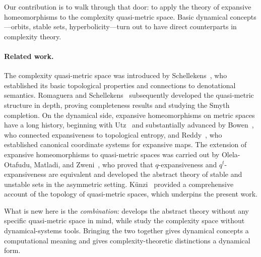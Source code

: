 \documentclass[11pt,a4paper]{article}
\theoremstyle{plain}
\theoremstyle{definition}
\begin{document}
Our contribution is to walk through that door: to apply the theory
of expansive homeomorphisms to the complexity quasi-metric space.
Basic dynamical concepts---orbits, stable sets, hyperbolicity---turn
out to have direct counterparts in complexity theory.

\paragraph{Related work.}
The complexity quasi-metric space was introduced by
Schellekens~\cite{schellekens1995}, who established its basic
topological properties and connections to denotational semantics.
Romaguera and Schellekens~\cite{romaguera1999} subsequently
developed the quasi-metric structure in depth, proving
completeness results and studying the Smyth completion.  On
the dynamical side, expansive homeomorphisms on metric spaces
have a long history, beginning with Utz~\cite{utz1950} and
substantially advanced by Bowen~\cite{bowen1975}, who connected
expansiveness to topological entropy, and Reddy~\cite{reddy1983},
who established canonical coordinate systems for expansive maps.
The extension of expansive homeomorphisms to quasi-metric spaces
was carried out by Olela-Otafudu, Matladi, and
Zweni~\cite{olela2024}, who proved that $q$-expansiveness and
$q^t$-expansiveness are equivalent and developed the abstract
theory of stable and unstable sets in the asymmetric setting.
K\"unzi~\cite{kunzi1995,kunzi2001} provided a comprehensive
account of the topology of quasi-metric spaces, which underpins
the present work.

What is new here is the \emph{combination}: \cite{olela2024}
develops the abstract theory without any specific quasi-metric
space in mind, while \cite{schellekens1995,romaguera1999} study
the complexity space without dynamical-systems tools.  Bringing
the two together gives dynamical concepts a computational meaning
and gives complexity-theoretic distinctions a dynamical form.
\end{document}
